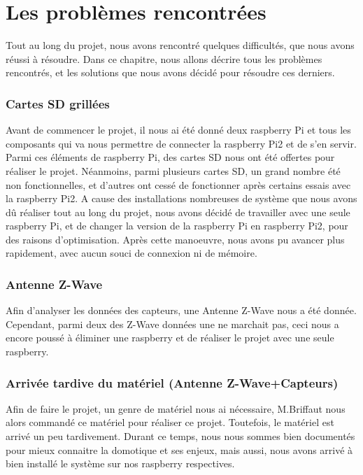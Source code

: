 

\newpage
\chapter{Les problèmes rencontrées}
Tout au long du projet, nous avons rencontré quelques difficultés, que nous avons réussi à résoudre. Dans ce chapitre, nous allons décrire tous les problèmes rencontrés, et les solutions que nous avons décidé pour résoudre ces derniers.
\subsection{Cartes SD grillées }
Avant de commencer le projet, il nous ai été donné deux raspberry Pi et tous les composants qui va nous permettre de connecter la raspberry Pi2 et de s'en servir.\newline
Parmi ces éléments de raspberry Pi, des cartes SD nous ont été offertes pour réaliser le projet. Néanmoins, parmi plusieurs cartes SD, un grand nombre été non fonctionnelles, et d'autres ont cessé de fonctionner après certains essais avec la raspberry Pi2.\newline
A cause des installations nombreuses de système que nous avons dû réaliser tout au long du projet, nous avons décidé de travailler avec une seule raspberry Pi, et de changer la version de la raspberry Pi en raspberry Pi2, pour des raisons d'optimisation. Après cette manoeuvre, nous avons pu avancer plus rapidement, avec aucun souci de connexion ni de mémoire.
\subsection{Antenne Z-Wave}
Afin d'analyser les données des capteurs, une Antenne Z-Wave nous a été donnée. Cependant, parmi deux des Z-Wave données une ne marchait pas, ceci nous a encore poussé à éliminer une raspberry et de réaliser le projet avec une seule raspberry.
\subsection{Arrivée tardive du matériel (Antenne Z-Wave+Capteurs)}
Afin de faire le projet, un genre de matériel nous ai nécessaire, M.Briffaut nous alors commandé ce matériel pour réaliser ce projet. Toutefois, le matériel est arrivé un peu tardivement. Durant ce temps, nous nous sommes bien documentés pour mieux connaitre la domotique et ses enjeux, mais aussi, nous avons arrivé à bien installé le système sur nos raspberry respectives.   

